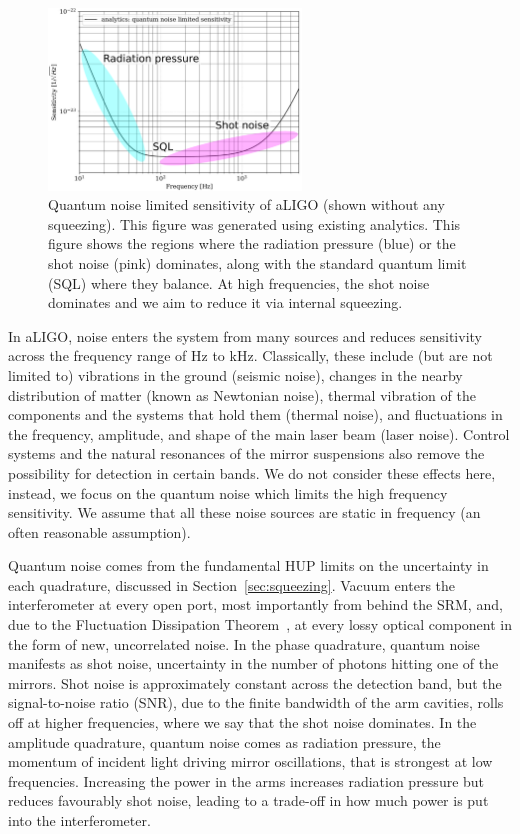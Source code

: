 \documentclass[aps,pra,superscriptaddress,reprint,nofootinbib]{revtex4-1}
\begin{document}
\begin{figure}[ht]%
	\begin{center}
	\includegraphics[width=0.6\textwidth]{figures/sqz_aLIGO_analytics_quantum_noise_budget-labelled.pdf}
	\end{center}
	\caption{Quantum noise limited sensitivity of aLIGO (shown without any squeezing). This figure was generated using existing analytics. This figure shows the regions where the radiation pressure (blue) or the shot noise (pink) dominates, along with the standard quantum limit (SQL) where they balance. At high frequencies, the shot noise dominates and we aim to reduce it via internal squeezing.}
	\label{fig:sqz_aLIGO_analytics_quantum_noise_budget}
\end{figure}


In aLIGO, noise enters the system from many sources and reduces sensitivity across the frequency range of Hz to kHz. Classically, these include (but are not limited to) vibrations in the ground (seismic noise), changes in the nearby distribution of matter (known as Newtonian noise), thermal vibration of the components and the systems that hold them (thermal noise), and fluctuations in the frequency, amplitude, and shape of the main laser beam (laser noise). Control systems and the natural resonances of the mirror suspensions also remove the possibility for detection in certain bands. We do not consider these effects here, instead, we focus on the quantum noise which limits the high frequency sensitivity. We assume that all these noise sources are static in frequency (an often reasonable assumption).


Quantum noise comes from the fundamental HUP limits on the uncertainty in each quadrature, discussed in Section~\ref{sec:squeezing}. Vacuum enters the interferometer at every open port, most importantly from behind the SRM, and, due to the Fluctuation Dissipation Theorem~\cite{Danilishin_2012}, at every lossy optical component in the form of new, uncorrelated noise. In the phase quadrature, quantum noise manifests as shot noise, uncertainty in the number of photons hitting one of the mirrors. Shot noise is approximately constant across the detection band, but the signal-to-noise ratio (SNR), due to the finite bandwidth of the arm cavities, rolls off at higher frequencies, where we say that the shot noise dominates. In the amplitude quadrature, quantum noise comes as radiation pressure, the momentum of incident light driving mirror oscillations, that is strongest at low frequencies. Increasing the power in the arms increases radiation pressure but reduces favourably shot noise, leading to a trade-off in how much power is put into the interferometer.
\end{document}
